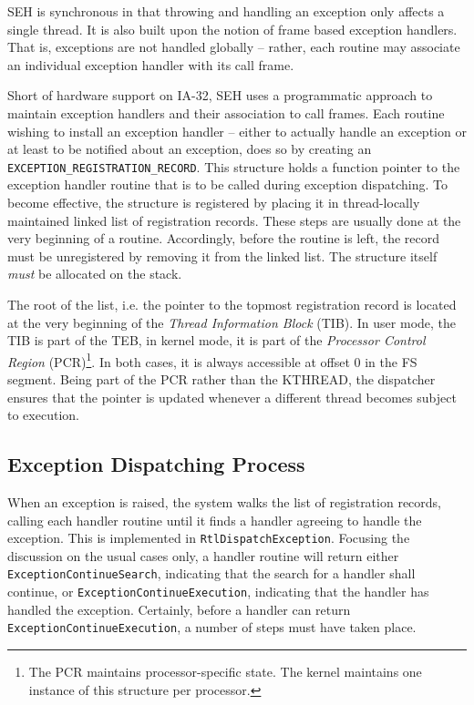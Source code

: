 SEH is synchronous in that throwing and handling an exception only affects
a single thread. It is also built upon the notion of frame based exception 
handlers. That is, exceptions are not handled globally -- rather, each routine 
may associate an individual exception handler with its call frame. 

Short of hardware support on IA-32, SEH uses a programmatic approach to
maintain exception handlers and their association to call frames. Each
routine wishing to install an exception handler -- either to actually
handle an exception or at least to be notified about an exception, does 
so by creating an \verb|EXCEPTION_REGISTRATION_RECORD|. This structure
holds a function pointer to the exception handler routine that is to
be called during exception dispatching. To become effective, the structure
is registered by placing it in thread-locally maintained linked list
of registration records. These steps are usually done at the very beginning
of a routine. Accordingly, before the routine is left, the record must be 
unregistered by removing it from the linked list. The structure itself
\emph{must} be allocated on the stack.

The root of the list, i.e. the pointer to the topmost registration record
is located at the very beginning of the \emph{Thread Information Block} (TIB).
In user mode, the TIB is part of the TEB, in kernel mode, it is part of the
\emph{Processor Control Region} (PCR)\footnote{The PCR maintains processor-specific
state. The kernel maintains one instance of this structure per processor.}. 
In both cases, it is always accessible at offset 0 in the FS segment. Being part of the PCR 
rather than the KTHREAD, the dispatcher ensures that the pointer is updated 
whenever a different thread becomes subject to execution.

\subsection{Exception Dispatching Process}
When an exception is raised, the system walks the list of registration records,
calling each handler routine until it finds a handler agreeing to handle the
exception. This is implemented in \verb|RtlDispatchException|.
Focusing the discussion on the usual cases only,
a handler routine will return either \verb|ExceptionContinueSearch|, indicating
that the search for a handler shall continue, or \verb|ExceptionContinueExecution|,
indicating that the handler has handled the exception. Certainly, before a handler 
can return \verb|ExceptionContinueExecution|, a number of steps must have taken place.

